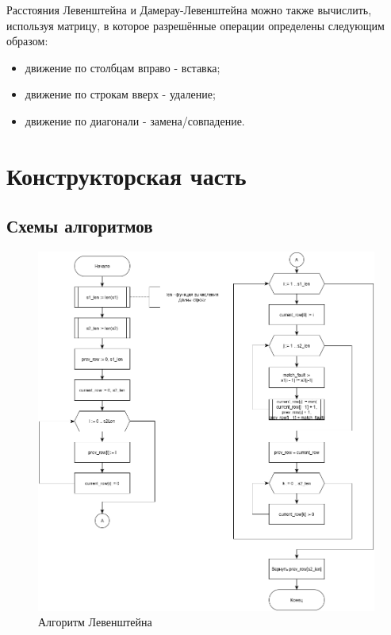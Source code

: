 \documentclass[12pt]{report}
\begin{document}
	Расстояния Левенштейна и Дамерау-Левенштейна можно также вычислить, используя матрицу, в которое разрешённые операции определены следующим образом:
	\begin{itemize}
		\item движение по столбцам вправо - вставка;
		\item движение по строкам вверх - удаление;
		\item движение по диагонали - замена/совпадение.
	\end{itemize}

	\chapter{Конструкторская часть}

	\section{Схемы алгоритмов}
	\begin{figure}
		\centering
		\includegraphics[width=1\linewidth]{leven}
		\caption{Алгоритм Левенштейна}
		\label{fig:leven}
	\end{figure}
\end{document}
